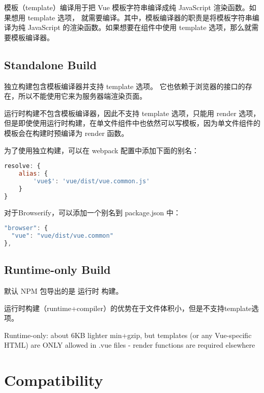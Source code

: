 模板（template）编译用于把 Vue 模板字符串编译成纯 JavaScript 渲染函数。如果想用 template 选项， 就需要编译。其中，模板编译器的职责是将模板字符串编译为纯 JavaScript 的渲染函数。如果想要在组件中使用 template 选项，那么就需要模板编译器。


\subsection{Standalone Build}





\begin{compactitem}
\item 独立构建包含模板编译器并支持 template 选项。 它也依赖于浏览器的接口的存在，所以不能使用它来为服务器端渲染页面。
\item 运行时构建不包含模板编译器，因此不支持 template 选项，只能用 render 选项，但是即使使用运行时构建，在单文件组件中也依然可以写模板，因为单文件组件的模板会在构建时预编译为 render 函数。
\end{compactitem}






为了使用独立构建，可以在 webpack 配置中添加下面的别名：

\begin{lstlisting}[language=JavaScript]
resolve: {
    alias: {
        'vue$': 'vue/dist/vue.common.js'
    }
}
\end{lstlisting}

对于Browserify，可以添加一个别名到 package.json 中：

\begin{lstlisting}[language=JavaScript]
"browser": {
  "vue": "vue/dist/vue.common"
},
\end{lstlisting}



\subsection{Runtime-only Build}


默认 NPM 包导出的是 运行时 构建。

运行时构建（runtime+compiler）的优势在于文件体积小，但是不支持template选项。

Runtime-only: about 6KB lighter min+gzip, but templates (or any Vue-specific HTML) are ONLY allowed in .vue files - render functions are required elsewhere 


\section{Compatibility}


